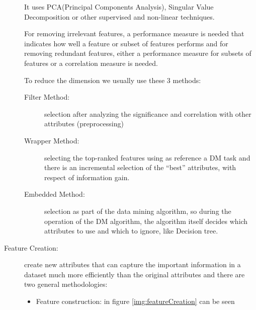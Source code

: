 \begin{description}
                                  It uses PCA(Principal Components Analysis), Singular Value Decomposition
                                  or other supervised and non-linear techniques.
                                
                                  For removing irrelevant features, a performance measure is needed that
                                  indicates how well a feature or subset of features performs and for removing
                                  redundant features, either a performance measure for subsets of features or a
                                  correlation measure is needed.

                                  To reduce the dimension we usually use these $3$ methods:
                                  \begin{description}
                                      \item [Filter Method: ] selection after analyzing the significance and 
                                                              correlation with other attributes (preprocessing)
                                      \item [Wrapper Method: ] selecting the top-ranked features using 
                                                               as reference a DM task and there is an incremental
                                                               selection of the “best” attributes, with respect
                                                               of information gain.
                                      \item [Embedded Method: ] selection as part of the data mining algorithm,
                                                                so during the operation of the DM algorithm,
                                                                the algorithm itself decides which attributes to use
                                                                and which to ignore, like Decision tree.
                                  \end{description}
    \item [Feature Creation: ] create new attributes that can capture the important information in a dataset
                               much more efficiently than the original attributes and 
                               there are two general methodologies:
                               \begin{itemize}
                                   \item Feature construction: in figure \ref{img:featureCreation} can be seen

\end{itemize}
\end{description}
